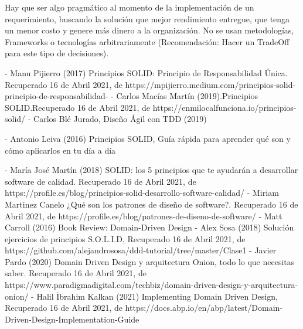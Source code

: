 \documentclass[12pt,letterpaper]{article}
\begin{document}
Hay que ser algo pragmático al momento de la implementación de un requerimiento, buscando la solución que mejor rendimiento entregue, que tenga un menor costo y genere más dinero a la organización. No se usan metodologías, Frameworks o tecnologías arbitrariamente (Recomendación: Hacer un TradeOff para este tipo de decisiones).
\begin{thebibliography}{XXX0000}
    \bibitem - Manu Pijierro (2017) Principios SOLID: Principio de Responsabilidad Única. Recuperado 16 de Abril 2021, de https://mpijierro.medium.com/principios-solid-principio-de-responsabilidad-%
    \bibitem - Carlos Macías Martín (2019).Principios SOLID.Recuperado 16 de Abril 2021, de https://enmilocalfunciona.io/principios-solid/
    \bibitem - Carlos Blé Jurado, Diseño Ágil con TDD (2019)
    
    \bibitem - Antonio Leiva (2016) Principios SOLID, Guía rápida para aprender qué son y cómo
    aplicarlos en tu día a día
    

    \bibitem - María José Martín (2018) SOLID: los 5 principios que te ayudarán a desarrollar software de calidad. Recuperado 16 de Abril 2021, de https://profile.es/blog/principios-solid-desarrollo-software-calidad/
    \bibitem - Miriam Martinez Canelo ¿Qué son los patrones de diseño de software?. Recuperado 16 de Abril 2021, de https://profile.es/blog/patrones-de-diseno-de-software/
    \bibitem - Matt Carroll (2016) Book Review: Domain-Driven Design 
    \bibitem - Alex Sosa (2018) Solución ejercicios de principios S.O.L.I.D, Recuperado 16 de Abril 2021, de https://github.com/alejandrososa/ddd-tutorial/tree/master/Clase1
    \bibitem - Javier Pardo (2020) Domain Driven Design y arquitectura Onion, todo lo que necesitas saber. Recuperado 16 de Abril 2021, de https://www.paradigmadigital.com/techbiz/domain-driven-design-y-arquitectura-onion/
    \bibitem - Halil İbrahim Kalkan (2021) Implementing Domain Driven Design, Recuperado 16 de Abril 2021, de https://docs.abp.io/en/abp/latest/Domain-Driven-Design-Implementation-Guide
    \end{thebibliography}
\end{document}
